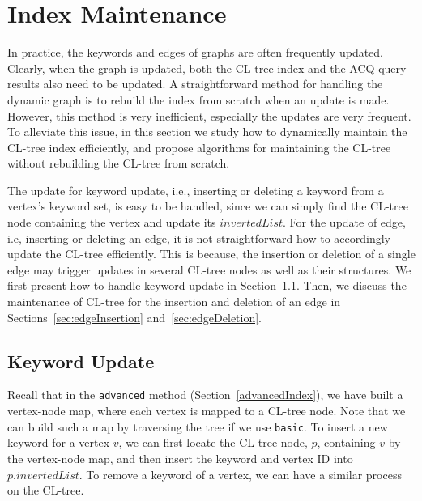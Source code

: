 {\color{blue}
\section{Index Maintenance}
\label{indexMaintenance}

In practice, the keywords and edges of graphs are often frequently updated.
Clearly, when the graph is updated, both the CL-tree index and the ACQ query results also need to be updated.
A straightforward method for handling the dynamic graph is to rebuild the index from scratch when an update is made.
However, this method is very inefficient, especially the updates are very frequent.
To alleviate this issue, in this section we study how to dynamically maintain the CL-tree index efficiently,
and propose algorithms for maintaining the CL-tree without rebuilding the CL-tree from scratch.

The update for keyword update, i.e., inserting or deleting a keyword from a vertex's keyword set, is easy to be handled, since we can simply find the CL-tree node containing the vertex and update its $invertedList$.
For the update of edge, i.e, inserting or deleting an edge, it is not straightforward how to accordingly update the CL-tree efficiently. This is because, the insertion or deletion of a single edge may trigger updates in several CL-tree nodes as well as their structures.
We first present how to handle keyword update in Section~\ref{sec:keyword}.
Then, we discuss the maintenance of CL-tree for the insertion and deletion of an edge in Sections~\ref{sec:edgeInsertion} and~\ref{sec:edgeDeletion}.

\subsection{Keyword Update}
\label{sec:keyword}
Recall that in the {\tt advanced} method (Section~\ref{advancedIndex}), we have built a vertex-node map, where each vertex is mapped to a CL-tree node. Note that we can build such a map by traversing the tree if we use {\tt basic}.
To insert a new keyword for a vertex $v$, we can first locate the CL-tree node, $p$, containing $v$ by the vertex-node map, and then insert the keyword and vertex ID into $p.invertedList$. To remove a keyword of a vertex, we can have a similar process on the CL-tree.




} 